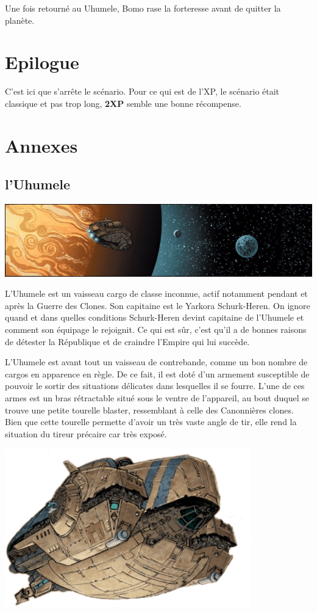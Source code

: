 \documentclass{jdrp}
\begin{document}
	Une fois retourné au Uhumele, Bomo rase la forteresse avant de quitter la planète.

	\section{Epilogue}
	C’est ici que s’arrête le scénario. Pour ce qui est de l’XP, le scénario était classique et pas trop long, \textbf{2XP} semble une bonne récompense.


	\newpage
	\section{Annexes}
	\subsection{l’Uhumele}\label{sec:uhumele}
	\noindent\includegraphics[width=\textwidth]{_img/songes-de-l-uhumele/uhumele-pano.png}

	L'Uhumele est un vaisseau cargo de classe inconnue, actif notamment pendant et après la Guerre des Clones. Son capitaine est le Yarkora Schurk-Heren. On ignore quand et dans quelles conditions Schurk-Heren devint capitaine de l’Uhumele et comment son équipage le rejoignit. Ce qui est sûr, c'est qu’il a de bonnes raisons de détester la République et de craindre l’Empire qui lui succède.

	L’Uhumele est avant tout un vaisseau de contrebande, comme un bon nombre de cargos en apparence en règle. De ce fait, il est doté d’un armement susceptible de pouvoir le sortir des situations délicates dans lesquelles il se fourre. L’une de ces armes est un bras rétractable situé sous le ventre de l’appareil, au bout duquel se trouve une petite tourelle blaster, ressemblant à celle des Canonnières clones. Bien que cette tourelle permette d’avoir un très vaste angle de tir, elle rend la situation du tireur précaire car très exposé. 

	\hspace{12em}
	\includegraphics[width=0.8\textwidth]{_img/songes-de-l-uhumele/uhumele.png}
	

	\onecolumn
	\nocite{*}
	\printbibliography
\end{document}
